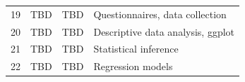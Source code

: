 \documentclass[]{article}
\begin{document}
\begin{longtable}[c]{@{}rlll@{}}
\begin{minipage}[t]{0.09\columnwidth}
19
\strut\end{minipage} &
\begin{minipage}[t]{0.15\columnwidth}\raggedright\strut
TBD
\strut\end{minipage} &
\begin{minipage}[t]{0.13\columnwidth}\raggedright\strut
TBD
\strut\end{minipage} &
\begin{minipage}[t]{0.51\columnwidth}\raggedright\strut
Questionnaires, data collection
\strut\end{minipage}\tabularnewline
\begin{minipage}[t]{0.09\columnwidth}\raggedleft\strut
20
\strut\end{minipage} &
\begin{minipage}[t]{0.15\columnwidth}\raggedright\strut
TBD
\strut\end{minipage} &
\begin{minipage}[t]{0.13\columnwidth}\raggedright\strut
TBD
\strut\end{minipage} &
\begin{minipage}[t]{0.51\columnwidth}\raggedright\strut
Descriptive data analysis, ggplot
\strut\end{minipage}\tabularnewline
\begin{minipage}[t]{0.09\columnwidth}\raggedleft\strut
21
\strut\end{minipage} &
\begin{minipage}[t]{0.15\columnwidth}\raggedright\strut
TBD
\strut\end{minipage} &
\begin{minipage}[t]{0.13\columnwidth}\raggedright\strut
TBD
\strut\end{minipage} &
\begin{minipage}[t]{0.51\columnwidth}\raggedright\strut
Statistical inference
\strut\end{minipage}\tabularnewline
\begin{minipage}[t]{0.09\columnwidth}\raggedleft\strut
22
\strut\end{minipage} &
\begin{minipage}[t]{0.15\columnwidth}\raggedright\strut
TBD
\strut\end{minipage} &
\begin{minipage}[t]{0.13\columnwidth}\raggedright\strut
TBD
\strut\end{minipage} &
\begin{minipage}[t]{0.51\columnwidth}\raggedright\strut
Regression models
\strut\end{minipage}\tabularnewline

\end{longtable}
\end{document}
